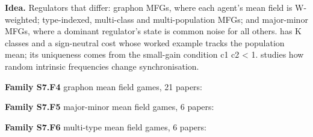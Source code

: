 \documentclass[10pt]{article}
\newcommand{\memb}[1]{\par\smallskip\textbf{#1}\quad}
\begin{document}
\textbf{Idea.} Regulators that differ: graphon MFGs, where each agent's mean field is W-weighted; type-indexed, multi-class and multi-population MFGs; and major-minor MFGs, where a dominant regulator's state is common noise for all others. \citet{Huang-large06} has K classes and a sign-neutral cost whose worked example tracks the population mean; its uniqueness comes from the small-gain condition c1 c2 \textless{} 1. \citet{Carmona-kuramoto25} studies how random intrinsic frequencies change synchronisation.

\memb{Family S7.F4} graphon mean field games, 21 papers: {\footnotesize \citetext{\citealp{Caines-graphon20}; \citealp{Carmona-stochastic22}; \citealp{Cui-learning21}; \citealp{Caines-graphon20b}; \citealp{Gao-graphon20}; \citealp{Gao-lqg20}; \citealp{Vasal-sequential21}\dag; \citealp{Aurell-finite22}; \citealp{Aurell-stochastic22}; \citealp{Cui-hypergraphon22}; \citealp{Hu-graphon22}; \citealp{Lacker-label22}; \citealp{Fabian-learning22}; \citealp{Parise-graphon23}; \citealp{Zhang-learning23}; \citealp{Zhang-learning23b}; \citealp{Dong-last24}; \citealp{Rokade-graphon24}\dag; \citealp{Zhou-graphon24}; \citealp{Amini-extended26}; \citealp{Anand-graphon26}}}

\memb{Family S7.F5} major-minor mean field games, 6 papers: {\footnotesize \citetext{\citealp{Carmona-alternative17}; \citealp{Huang-large10}; \citealp{Bensoussan-mean15}\dag; \citealp{Carmona-finite16}; \citealp{Carmona-probabilistic16}; \citealp{Dayanikli-multi24}}}

\memb{Family S7.F6} multi-type mean field games, 6 papers: {\footnotesize \citetext{\citealp{Huang-large07}; \citealp{Subramanian-multi20}; \citealp{Mondal-approximation22}; \citealp{Subramanian-decentralized22}; \citealp{Qiao-heterogeneous25}; \citealp{Braun-mean26}}}
\end{document}
